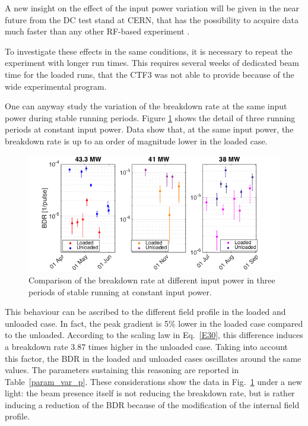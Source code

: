 A new insight on the effect of the input power variation will be given in the near future from the DC test stand at CERN, that has the possibility to acquire data much faster than any other RF-based experiment \cite{Walter:PC}.

To investigate these effects in the same conditions, it is necessary to repeat the experiment with longer run times. This requires several weeks of dedicated beam time for the loaded runs, that the CTF3 was not able to provide because of the wide experimental program.

One can anyway study the variation of the breakdown rate at the same input power during stable running periods. Figure \ref{BDR_3sectors} shows the detail of three running periods at constant input power. Data show that, at the same input power, the breakdown rate is up to an order of magnitude lower in the loaded case. 

\begin{figure}[h]
\centering 
\includegraphics[scale=0.5]{pictures/BDR_zooms.png}
\caption{Comparison of the breakdown rate at different input power in three periods of stable running  at constant input power.}
\label{BDR_3sectors}
\end{figure}

This behaviour can be ascribed to the different field profile in the loaded and unloaded case. In fact, the peak gradient is 5\% lower in the loaded case compared to the unloaded. According to the scaling law in Eq.~\ref{E30}, this difference induces a breakdown rate 3.87 times higher in the unloaded case. Taking into account this factor, the BDR in the loaded and unloaded cases oscillates around the same values. The parameters sustaining this reasoning are reported in Table~\ref{param_var_p}.  These considerations show the data in Fig.~\ref{BDR_3sectors} under a new light: the beam presence itself is not reducing the breakdown rate, but is rather inducing a reduction of the BDR because of the modification of the internal field profile.

